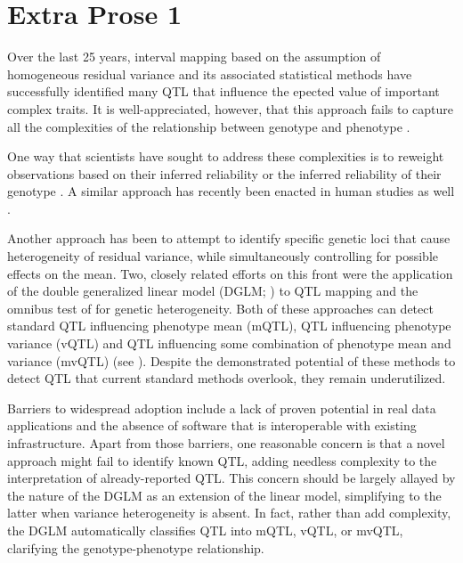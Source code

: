 \section{Extra Prose 1}
Over the last 25 years, interval mapping based on the assumption of homogeneous residual variance and its associated statistical methods \citep{Lander1989a,Martinez1992,Haley1992,Churchill1994} have successfully identified many QTL that influence the epected value of important complex traits.
    It is well-appreciated, however, that this approach fails to capture all the complexities of the relationship between genotype and phenotype \citep{GeilerSamerotte2013,Nelson2013,Shen2012,Forsberg2015,Pare2010}.

    One way that scientists have sought to address these complexities is to reweight observations based on their inferred reliability \citep{Xu1998} or the inferred reliability of their genotype \citep{Feenstra2006}.
    A similar approach has recently been enacted in human studies as well \citep{Ma2015}.

    Another approach has been to attempt to identify specific genetic loci that cause heterogeneity of residual variance, while simultaneously controlling for possible effects on the mean.
    Two, closely related efforts on this front were the application of the double generalized linear model (DGLM; \citealt{Smyth1989}) to QTL mapping \citep{Ronnegard2011a} and the omnibus test of \citet{Cao2014} for genetic heterogeneity.
    Both of these approaches can detect standard QTL influencing phenotype mean (mQTL), QTL influencing phenotype variance (vQTL) and QTL influencing some combination of phenotype mean and variance (mvQTL) (see \CortyMethodsPaper).
    Despite the demonstrated potential of these methods to detect QTL that current standard methods overlook, they remain underutilized.

    Barriers to widespread adoption include a lack of proven potential in real data applications and the absence of software that is interoperable with existing infrastructure.
    Apart from those barriers, one reasonable concern is that a novel approach might fail to identify known QTL, adding needless complexity to the interpretation of already-reported QTL.
    This concern should be largely allayed by the nature of the DGLM as an extension of the linear model, simplifying to the latter when variance heterogeneity is absent.
    In fact, rather than add complexity, the DGLM automatically classifies QTL into mQTL, vQTL, or mvQTL, clarifying the genotype-phenotype relationship.

